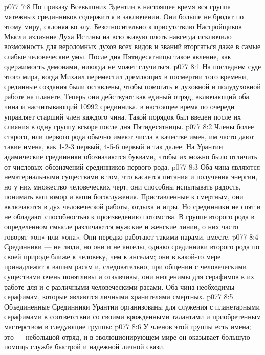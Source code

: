\vs p077 7:8 По приказу Всевышних Эдентии в настоящее время вся группа мятежных срединников содержится в заключении. Они больше не бродят по этому миру, склоняя ко злу. Безотносительно к присутствию Настройщиков Мысли излияние Духа Истины на всю живую плоть навсегда исключило возможность для вероломных духов всех видов и званий вторгаться даже в самые слабые человеческие умы. После дня Пятидесятницы такое явление, как одержимость демонами, никогда не может случиться.
\vs p077 8:1 На последнем суде этого мира, когда Михаил переместил дремлющих в посмертии того времени, срединные создания были оставлены, чтобы помогать в духовной и полудуховной работе на планете. Теперь они действуют как единый отряд, включающий оба чина и насчитывающий 10992 срединника.  в настоящее время по очереди управляет старший член каждого чина. Такой порядок был введен после их слияния в одну группу вскоре после дня Пятидесятницы.
\vs p077 8:2 Члены более старого, или первого рода обычно имеют числа в качестве имен, им часто дают такие имена, как 1\hyp{}2\hyp{}3 первый, 4\hyp{}5\hyp{}6 первый и так далее. На Урантии адамические срединники обозначаются буквами, чтобы их можно было отличить от числовых обозначений срединников первого рода.
\vs p077 8:3 Оба чина являются нематериальными существами в том, что касается питания и получения энергии, но у них множество человеческих черт, они способны испытывать радость, понимать ваш юмор и ваши богослужения. Приставленные к смертным, они включаются в дух человеческой работы, отдыха и игры. Но срединники не спят и не обладают способностью к произведению потомства. В группе второго рода в определенном смысле различаются мужские и женские линии, о них часто говорят «он» или «она». Они нередко работают такими парами, вместе.
\vs p077 8:4 Срединники --- не люди, но они и не ангелы, однако срединники второго рода по своей природе ближе к человеку, чем к ангелам; они в какой\hyp{}то мере принадлежат к вашим расам и, следовательно, при общении с человеческими существами очень понятливы и отзывчивы, они неоценимы для серафимов в их работе для и с различными человеческими расами. Оба чина необходимы серафимам, которые являются личными хранителями смертных.
\vs p077 8:5 \pc Объединенные Срединники Урантии организованы для служения с планетарными серафимами в соответствии со своими врожденными талантами и приобретенным мастерством в следующие группы:
\vs p077 8:6 \bibnobreakspace {} У членов этой группы есть имена; это --- небольшой отряд, и в эволюционирующем мире он оказывает большую помощь службе быстрой и надежной личной связи.
